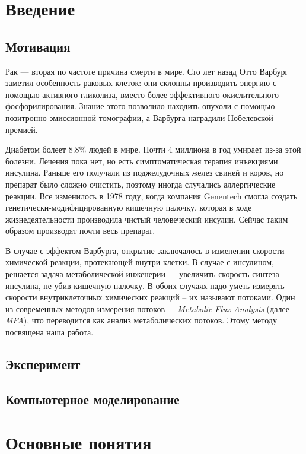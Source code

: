 \documentclass[a4paper, 12pt, left=30mm, right=15mm, top=20mm, bottom=20mm]{report}
\begin{document}
\tableofcontents

\chapter{Введение}
\section{Мотивация}
Рак --- вторая по частоте причина смерти в мире\cite{Cancer_statistics}. Сто лет назад Отто Варбург заметил\cite{Warburg_effect} особенность раковых клеток: они склонны производить энергию с помощью активного гликолиза, вместо более эффективного окислительного фосфорилирования. Знание этого позволило находить опухоли с помощью позитронно-эмиссионной томографии, а Варбурга наградили Нобелевской премией.

Диабетом болеет 8.8\% людей в мире\cite{Diabetes_statistics}. Почти 4 миллиона в год умирает из-за этой болезни. Лечения пока нет, но есть симптоматическая терапия инъекциями инсулина. Раньше его получали из поджелудочных желез свиней и коров, но препарат было сложно очистить, поэтому иногда случались аллергические реакции. Все изменилось в 1978 году, когда компания Genentech смогла создать генетически-модифицированную кишечную палочку, которая в ходе жизнедеятельности производила чистый человеческий инсулин\cite{Genentech_paper}. Сейчас таким образом производят почти весь препарат.

В случае с эффектом Варбурга, открытие заключалось в изменении скорости химической реакции, протекающей внутри клетки. В случае с инсулином, решается задача метаболической инженерии --- увеличить скорость синтеза инсулина, не убив кишечную палочку. В обоих случаях надо уметь измерять скорости внутриклеточных химических реакций -- их называют потоками. Один из современных методов измерения потоков -- \emph{-Metabolic Flux Analysis} (далее \emph{MFA}), что переводится как анализ метаболических потоков. Этому методу посвящена наша работа.

\section{Эксперимент}
\section{Компьютерное моделирование}

\chapter{Основные понятия}
\end{document}
